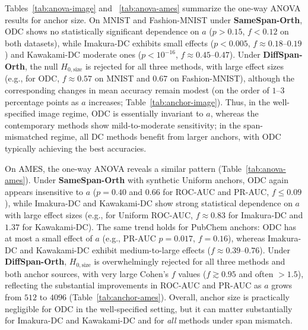 \documentclass[final,3p,times]{elsarticle}
\theoremstyle{plain}
\begin{document}
Tables~\ref{tab:anova-image} and ~\ref{tab:anova-ames} summarize the one-way ANOVA results for anchor size. On MNIST and Fashion-MNIST under \textbf{SameSpan-Orth}, ODC shows no statistically significant dependence on $a$ ($p>0.15$, $f<0.12$ on both datasets), while Imakura-DC exhibits small effects ($p<0.005$, $f\approx 0.18$--$0.19$) and Kawakami-DC moderate ones
($p<10^{-16}$, $f\approx 0.45$--$0.47$). Under \textbf{DiffSpan-Orth}, the null $H_{0,\text{size}}$ is rejected for all three methods, with large effect sizes (e.g., for ODC, $f\approx 0.57$ on MNIST and $0.67$ on Fashion-MNIST), although the corresponding changes in mean accuracy remain modest (on the order of $1$--$3$ percentage points as $a$ increases; Table~\ref{tab:anchor-image}). Thus, in the well-specified image regime, ODC is essentially invariant to $a$, whereas the contemporary methods show mild-to-moderate sensitivity; in the span-mismatched regime, all DC methods benefit from larger anchors, with ODC typically achieving the best accuracies.

On AMES, the one-way ANOVA reveals a similar pattern (Table~\ref{tab:anova-ames}). Under \textbf{SameSpan-Orth} with synthetic Uniform anchors, ODC again appears insensitive to $a$ ($p=0.40$ and $0.66$ for ROC-AUC and PR-AUC, $f\leq 0.09$), while Imakura-DC and Kawakami-DC show strong statistical dependence on $a$ with large effect sizes (e.g., for Uniform ROC-AUC, $f\approx 0.83$ for Imakura-DC and $1.37$ for Kawakami-DC). The same trend holds for PubChem anchors: ODC has at most a small effect of $a$ (e.g., PR-AUC $p=0.017$, $f=0.16$), whereas Imakura-DC and Kawakami-DC exhibit medium-to-large effects ($f\approx 0.39$--$0.76$). Under \textbf{DiffSpan-Orth}, $H_{0,\text{size}}$ is overwhelmingly rejected for all three methods and both anchor sources, with very large Cohen's $f$ values ($f\gtrsim 0.95$ and often $>1.5$), reflecting the substantial improvements in ROC-AUC and PR-AUC as $a$ grows from $512$ to $4096$ (Table~\ref{tab:anchor-ames}). Overall, anchor size is practically negligible for ODC in the well-specified setting, but it can matter substantially for Imakura-DC and Kawakami-DC and for \emph{all} methods under span mismatch.
\end{document}
